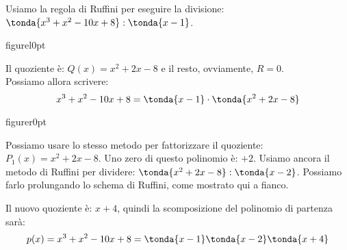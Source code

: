 Usiamo la regola di Ruffini per eseguire la divisione:
\(\tonda{x^3+x^2-10x+8} : \tonda{x-1}\).

\begin{wrapfloat}{figure}{l}{0pt}
% 
\scompruffiniaa
\end{wrapfloat}


Il quoziente è: \(Q(x)=x^2+2x-8\) e il resto, ovviamente, \(R=0\).\\
Possiamo allora scrivere:
\[x^3+x^2-10x+8=\tonda{x-1}\cdot \tonda{x^2+2x-8}\]

\begin{wrapfloat}{figure}{r}{0pt}
% 
\scompruffiniac
\end{wrapfloat}

Possiamo usare lo stesso metodo per fattorizzare il quoziente: 
\(P_1(x)=x^2+2x-8\). 
Uno zero di questo polinomio è: \(+2\). 
Usiamo ancora il metodo di Ruffini per dividere: 
\(\tonda{x^2+2x-8} : \tonda{x-2}\).
Possiamo farlo prolungando lo schema di Ruffini, come mostrato qui a fianco.

Il nuovo quoziente è: \(x+4\), quindi la scomposizione del polinomio di 
partenza sarà:
\[p(x)=x^3+x^2-10x+8 = \tonda{x-1} \tonda{x-2} \tonda{x+4}\]


